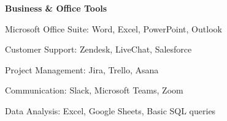 \textbf{Business \& Office Tools}
\begin{subitems}
    \item Microsoft Office Suite: Word, Excel, PowerPoint, Outlook
    \item Customer Support: Zendesk, LiveChat, Salesforce
    \item Project Management: Jira, Trello, Asana
    \item Communication: Slack, Microsoft Teams, Zoom
    \item Data Analysis: Excel, Google Sheets, Basic SQL queries
\end{subitems}

